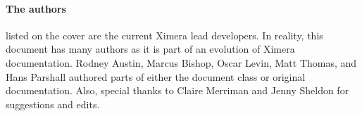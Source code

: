 \documentclass{ximera}
\begin{document}
\paragraph{The authors} listed on the cover are the current Ximera lead
developers. In reality, this document has many authors as it is part of an
evolution of Ximera documentation. Rodney Austin, Marcus Bishop, Oscar Levin, Matt Thomas, and Hans
Parshall authored parts of either the document class or original
documentation. Also, special thanks to Claire Merriman and Jenny Sheldon for suggestions and edits.
\end{document}
